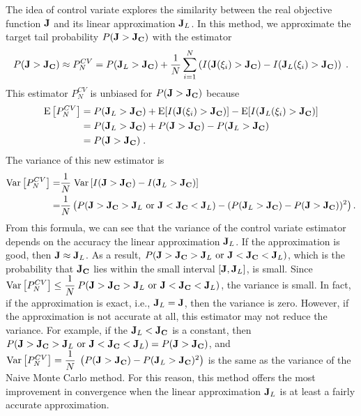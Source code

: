 The idea of control variate \cite[]{glynn_cv} explores the similarity
between the real objective
function $\bf J$ and its linear approximation ${\bf J}_L$.  In this method,
we approximate the target tail probability $P({\bf J} > {\bf J_C})$
with the estimator
\[ P({\bf J} > {\bf J_C}) \approx P^{CV}_N
 = P({\bf J}_L > {\bf J_C}) + \frac{1}{N}
   \sum_{i=1}^N \left(
   I({\bf J}(\xi_i) > {\bf J_C}) - I({\bf J}_L(\xi_i) > {\bf J_C})\right) \;.
\]
This estimator $P^{CV}_N$ is unbiased for $P({\bf J} > {\bf J_C})$
because
\[ \begin{split}
   \mathrm{E}\left[P^{CV}_N\right] &= P({\bf J}_L > {\bf J_C})
 + \mathrm{E}[I({\bf J}(\xi_i) > {\bf J_C})]
 - \mathrm{E}[I({\bf J}_L(\xi_i) > {\bf J_C})] \\
&= P({\bf J}_L > {\bf J_C}) + P({\bf J} > {\bf J_C})
 - P({\bf J}_L > {\bf J_C}) \\
&= P({\bf J} > {\bf J_C}) \;.
\end{split} \]
The variance of this new estimator is
\begin{equation} \begin{split} \label{var_cv}
   \mathrm{Var}\left[P^{CV}_N\right] =& \frac{1}{N} \;
   \mathrm{Var}\left[I({\bf J} > {\bf J_C}) -
                     I({\bf J}_L > {\bf J_C})\right] \\
=& \frac{1}{N} \left(P({\bf J} > {\bf J_C} > {\bf J}_L \mbox{ or }
           {\bf J} < {\bf J_C} < {\bf J}_L) -
         (P({\bf J}_L > {\bf J_C}) - P({\bf J} > {\bf J_C}))^2 \right) .
\end{split} \end{equation}
From this formula, we can see that the variance of the control variate
estimator depends on the accuracy the linear approximation ${\bf J}_L$.
If the approximation is good, then
${\bf J} \approx {\bf J}_L$.  As a result, $P({\bf J} > {\bf J_C} > {\bf J}_L
\mbox{ or } {\bf J} < {\bf J_C} < {\bf J}_L)$, which is the probability that
${\bf J_C}$ lies within the small interval $[{\bf J}, {\bf J}_L]$, is small.
Since $\mathrm{Var}\left[P^{CV}_N\right] \le \dfrac{1}{N}\:
P({\bf J} > {\bf J_C} > {\bf J}_L
\mbox{ or } {\bf J} < {\bf J_C} < {\bf J}_L)$, the variance is small.
In fact, if the approximation is exact, i.e., ${\bf J}_L = {\bf J}$, then
the variance is zero.  However, if the approximation is not
accurate at all, this estimator may not reduce the variance.  For
example, if the ${\bf J}_L < {\bf J_C}$ is a constant, then
$P({\bf J} > {\bf J_C} > {\bf J}_L
\mbox{ or } {\bf J} < {\bf J_C} < {\bf J}_L) = P({\bf J} > {\bf J_C})$,
and $ \mathrm{Var}\left[P^{CV}_N\right] = \dfrac{1}{N} \;
\left(P({\bf J} > {\bf J_C}) -
     P({\bf J}_L > {\bf J_C})^2 \right)$ is the same as the variance of
the Naive Monte Carlo method.  For this reason, this method offers the most
improvement in convergence when the linear approximation ${\bf J}_L$ is
at least a fairly accurate approximation.

